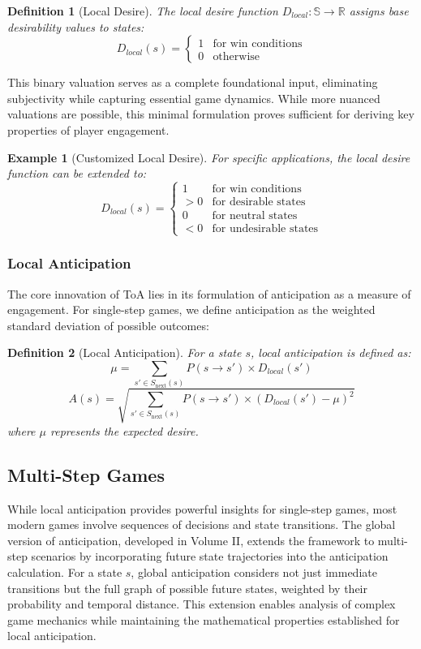 \documentclass{article}
\newtheorem{definition}{Definition}[]
\newtheorem{example}{Example}[]
\begin{document}
\begin{definition}[Local Desire]
The local desire function $D_{local}: \mathbb{S} \rightarrow \mathbb{R}$ assigns base desirability values to states:
\[
D_{local}(s) =
\begin{cases}
    1 & \text{for win conditions} \\
    0 & \text{otherwise}
\end{cases}
\]
\end{definition}

This binary valuation serves as a complete foundational input, eliminating subjectivity while capturing essential game dynamics. While more nuanced valuations are possible, this minimal formulation proves sufficient for deriving key properties of player engagement.

\begin{example}[Customized Local Desire]
For specific applications, the local desire function can be extended to:
\[
D_{local}(s) =
\begin{cases}
1 & \text{for win conditions} \\
> 0 & \text{for desirable states} \\
0 & \text{for neutral states} \\
< 0 & \text{for undesirable states}
\end{cases}
\]
\end{example}

\subsubsection{Local Anticipation}
The core innovation of ToA lies in its formulation of anticipation as a measure of engagement. For single-step games, we define anticipation as the weighted standard deviation of possible outcomes:
\begin{definition}[Local Anticipation]
For a state $s$, local anticipation is defined as:
\[
\mu = \sum_{s' \in S_{\text{next}}(s)} P(s \rightarrow s') \times D_{local}(s')
\]
\[
A(s) = \sqrt{\sum_{s' \in S_{\text{next}}(s)} P(s \rightarrow s') \times (D_{local}(s') - \mu)^2}
\]
where $\mu$ represents the expected desire.
\end{definition}

\subsection{Multi-Step Games}
While local anticipation provides powerful insights for single-step games, most modern games involve sequences of decisions and state transitions. The global version of anticipation, developed in Volume II, extends the framework to multi-step scenarios by incorporating future state trajectories into the anticipation calculation.
For a state $s$, global anticipation considers not just immediate transitions but the full graph of possible future states, weighted by their probability and temporal distance. This extension enables analysis of complex game mechanics while maintaining the mathematical properties established for local anticipation.
\end{document}

